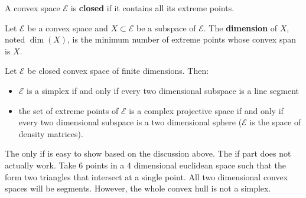 \begin{defn}
	A convex space $\mathcal{E}$ is \textbf{closed} if it contains all its extreme points.
\end{defn}

\begin{defn}
	Let $\mathcal{E}$ be a convex space and $X \subset \mathcal{E}$ be a subspace of $\mathcal{E}$. The \textbf{dimension} of $X$, noted $\dim(X)$, is the minimum number of extreme points whose convex span is $X$.
\end{defn}

\begin{conj}
	Let $\mathcal{E}$ be closed convex space of finite dimensions. Then:
	\begin{itemize}
		\item $\mathcal{E}$ is a simplex if and only if every two dimensional subspace is a line segment
		\item the set of extreme points of $\mathcal{E}$ is a complex projective space if and only if every two dimensional subspace is a two dimensional sphere ($\mathcal{E}$ is the space of density matrices).
	\end{itemize}
\end{conj}

\begin{remark}
	The only if is easy to show based on the discussion above. The if part does not actually work. Take 6 points in a 4 dimensional euclidean space such that the form two triangles that intersect at a single point. All two dimensional convex spaces will be segments. However, the whole convex hull is not a simplex. 
\end{remark}
